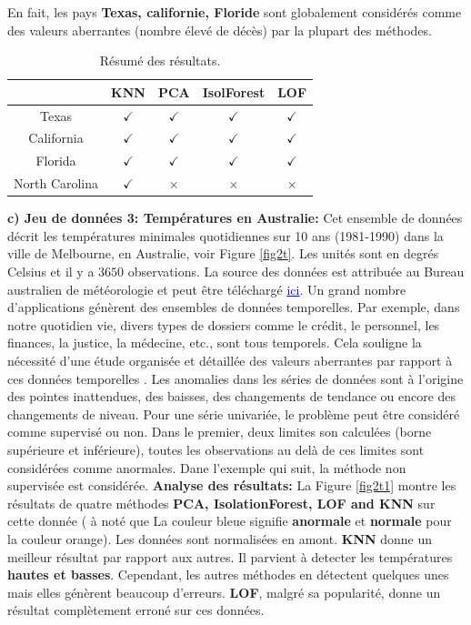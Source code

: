 En fait, les pays \textbf{Texas, californie, Floride} sont globalement considérés comme des valeurs aberrantes (nombre élevé de décès) par la plupart des méthodes. 


%
%
\begin{table}[ht!]
\centering
 \begin{tabular}{||c c c c c||} 
 \hline
 &  KNN & PCA & IsolForest & LOF\\ [0.5ex] 
 \hline\hline
Texas & $\checkmark$ & $\checkmark$  & $\checkmark$ & $\checkmark$ \\ 
 California & $\checkmark$ & $\checkmark$  & $\checkmark$ & $\checkmark$ \\
Florida & $\checkmark$ & $\checkmark$  & $\checkmark$ & $\checkmark$ \\
 North Carolina & $\checkmark$ & $\times$  & $\times$ & $\times$ \\ [1ex] 
 \hline
 \end{tabular}
 \caption{Résumé des résultats.}
\end{table}

%
%
%
\noindent\textbf{c) Jeu de données 3: Températures en Australie:}
Cet ensemble de données décrit les températures minimales quotidiennes sur 10 ans (1981-1990) dans la ville de Melbourne, en Australie, voir Figure \ref{fig2t}. Les unités sont en degrés Celsius et il y a $3650$ observations. La source des données est attribuée au Bureau australien de météorologie et peut être téléchargé \href{https://machinelearningmastery.com/time-series-data-visualization-with-python/}{\textcolor{blue}{\underline{ici}}}. Un grand nombre d'applications génèrent des ensembles de données temporelles. Par exemple, dans notre quotidien vie, divers types de dossiers comme le crédit, le personnel, les finances, la justice, la médecine, etc., sont tous temporels. Cela souligne la nécessité d'une étude organisée et détaillée des valeurs aberrantes par rapport à ces données temporelles \cite{A5}. Les anomalies dans les séries de données  sont à l'origine des pointes inattendues, des baisses, des changements de tendance ou encore des changements de niveau. Pour une série univariée, le problème peut être considéré comme supervisé ou non. Dans le premier, deux limites son calculées (borne supérieure et inférieure), toutes les observations au delà de ces limites sont considérées comme anormales. Dane l'exemple qui suit, la méthode non supervisée est considérée. \newl
\noindent\textbf{Analyse des résultats:} 
La Figure \eqref{fig2t1} montre les résultats de quatre méthodes \textbf{PCA, IsolationForest, LOF and KNN} sur cette donnée ( à noté que La couleur bleue signifie \textbf{anormale} et \textbf{normale} pour la couleur orange). Les données sont normalisées en amont. \textbf{KNN} donne un meilleur résultat par rapport aux autres. Il parvient à detecter les températures \textbf{hautes et basses}. Cependant, les autres méthodes en détectent quelques unes mais elles génèrent beaucoup d'erreurs. \textbf{LOF}, malgré sa popularité, donne un résultat complètement erroné sur ces données. 

